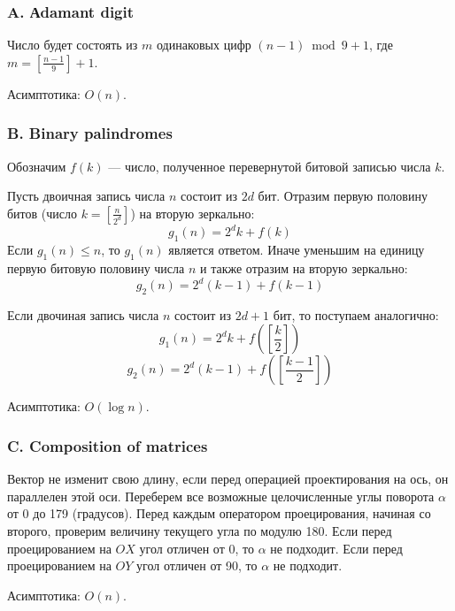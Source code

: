 \subsubsection*{A. Аdamant digit} 


Число будет состоять из $m$ одинаковых цифр $(n-1) \bmod 9 + 1$, где $m = \left[\frac{n-1}{9}\right] + 1$.

Асимптотика: $O(n)$.



\subsubsection*{B. Binary palindromes} 


Обозначим $f(k)$ --- число, полученное перевернутой битовой записью числа $k$.

Пусть двоичная запись числа $n$ состоит из $2d$ бит. Отразим  первую половину битов (число $k = \left[\frac{n}{2^d}\right]$) на вторую зеркально:
$$g_1(n) = 2^d k + f(k)$$
Если $g_1(n) \leqslant n$, то $g_1(n)$ является ответом. Иначе уменьшим на единицу первую битовую половину числа $n$ и также отразим на вторую зеркально:
$$g_2(n) = 2^d (k - 1) + f(k - 1)$$

Если двочиная запись числа $n$ состоит из $2d+1$ бит, то поступаем аналогично:
$$g_1(n) = 2^d k + f\left(\left[ \frac{k}{2} \right]\right)$$
$$g_2(n) = 2^d (k - 1) + f\left(\left[ \frac{k-1}{2} \right]\right)$$

Асимптотика: $O(\log n)$.



\subsubsection*{C. Composition of matrices} 


Вектор не изменит свою длину, если перед операцией проектирования на ось, он параллелен этой оси. Переберем все возможные целочисленные углы поворота $\alpha$ от 0 до 179 (градусов). Перед каждым оператором проецирования, начиная со второго, проверим величину текущего угла по модулю 180. Если перед проецированием на $OX$ угол отличен от 0, то $\alpha$ не подходит. Если перед проецированием на $OY$ угол отличен от 90, то $\alpha$ не подходит.

Асимптотика: $O(n)$.



